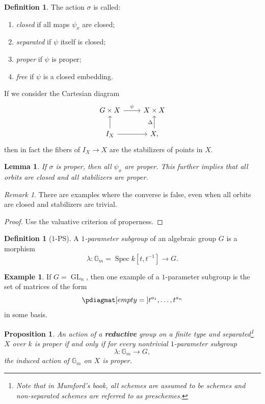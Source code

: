 \documentclass{amsart}
\newtheorem{prop}[thm]{Proposition}
\newtheorem{lem}[thm]{Lemma}
\theoremstyle{definition}
\newtheorem{defn}[thm]{Definition}
\newtheorem{exm}[thm]{Example}
\theoremstyle{remark}
\newtheorem{rmk}[thm]{Remark}
\theoremstyle{plain}
\theoremstyle{definition}
\theoremstyle{remark}
\newcommand{\G}{\mathbb{G}}
\newcommand{\on}[1]{\operatorname{#1}}
\newcommand{\1}{\mathbf{1}}
\newcommand{\2}{\mathbf{2}}
\newcommand{\3}{\mathbf{3}}
\DeclareMathOperator{\Spec}{Spec}
\begin{document}
\begin{defn}
    The action \(\sigma\) is called:
    \begin{enumerate}
        \item \textit{closed} if all maps \(\psi_x\) are closed;
        \item \textit{separated} if \(\psi\) itself is closed;
        \item \textit{proper} if \(\psi\) is proper;
        \item \textit{free} if \(\psi\) is a closed embedding.
    \end{enumerate}
\end{defn}

If we consider the Cartesian diagram
\begin{equation*}
\begin{tikzcd}
    G \times X \ar{r}{\psi} & X \times X \\
    I_X \ar{r} \ar{u} & X \ar{u}{\Delta},
\end{tikzcd}
\end{equation*}
then in fact the fibers of \(I_X \to X\) are the stabilizers of points in \(X\).

\begin{lem}
    If \(\sigma\) is proper, then all \(\psi_x\) are proper. This further implies that all orbits are closed and all stabilizers are proper.
\end{lem}

\begin{rmk}
    There are examples where the converse is false, even when all orbits are closed and stabilizers are trivial.
\end{rmk}

\begin{proof}
    Use the valuative criterion of properness.
\end{proof}

\begin{defn}[$1$-PS]
    A \textit{$1$-parameter subgroup} of an algebraic group \(G\) is a morphism
    \[ \lambda \colon \G_m = \Spec k[t, t^{-1}] \to G. \]
\end{defn}

\begin{exm}
    If \(G = \on{GL}_n\), then one example of a $1$-parameter subgroup is
    the set of matrices of the form
    \[ \pdiagmat[empty={}]{t^{a_1}, \ldots, t^{a_n}} \]
    in some basis.
\end{exm}

\begin{prop}\label{prop:1-ps-proper}
    An action of a \textbf{reductive} group on a finite type and separated\footnote{Note that in Mumford's book, all schemes are assumed to be schemes and non-separated schemes are referred to as preschemes.} \(X\) over \(k\) is proper if and only if for every nontrivial \(1\)-parameter subgroup
    \[ \lambda \colon \G_m \to G, \]
    the induced action of \(\G_m\) on \(X\) is proper.
\end{prop}
\end{document}
